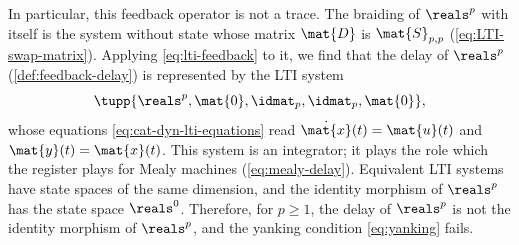 In particular, this feedback operator is not a trace.
The braiding of $\reals^p$ with itself is the system without state whose matrix $\mat{D}$ is $\mat{S}_{p,p}$ (\cref{eq:LTI-swap-matrix}).
Applying \cref{eq:lti-feedback} to it, we find that the delay of $\reals^p$ (\cref{def:feedback-delay}) is represented by the LTI system
\begin{equation}
    \label{eq:lti-delay}
    \tupp{\reals^p, \mat{0}, \idmat_p, \idmat_p, \mat{0}},
\end{equation}
whose equations \cref{eq:cat-dyn-lti-equations} read $\dot{\mat{x}}(t) = \mat{u}(t)$ and $\mat{y}(t) = \mat{x}(t)$.
This system is an integrator; it plays the role which the register plays for Mealy machines (\cref{eq:mealy-delay}).
Equivalent LTI systems have state spaces of the same dimension, and the identity morphism of $\reals^p$ has the state space $\reals^0$.
Therefore, for $p \geq 1$, the delay of $\reals^p$ is not the identity morphism of $\reals^p$, and the yanking condition \cref{eq:yanking} fails.
